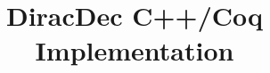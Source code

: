 \documentclass{article}
\title{\textbf{DiracDec C++/Coq Implementation\cite{ExampleCitation}}}
\begin{document}
\maketitle


\newcommand{\reduce}{\triangleright}

\newcommand{\Sort}{\mathsf{Sort}}
\newcommand{\WF}{\mathcal{WF}}

\newcommand{\Type}{\mathsf{Type}}
\newcommand{\BaseS}{\mathsf{Base}}

\newcommand{\SType}{\mathcal{S}}
\newcommand{\KType}{\mathcal{K}}
\newcommand{\BType}{\mathcal{B}}
\newcommand{\OType}{\mathcal{O}}

\newcommand{\ZEROK}{\mathbf{0}_\mathcal{K}}
\newcommand{\ZEROB}{\mathbf{0}_\mathcal{B}}
\newcommand{\ZEROO}{\mathbf{0}_\mathcal{O}}

\newcommand{\PAIR}{\mathsf{PAIR}}

\newcommand{\ZERO}{\mathsf{0}}
\newcommand{\ONE}{\mathsf{1}}
\newcommand{\ADDS}{\mathsf{ADDS}}
\newcommand{\ADD}{\mathsf{ADD}}
\newcommand{\MULS}{\mathsf{MULS}}
\newcommand{\MUL}{\mathsf{MUL}}
\newcommand{\CONJ}{\mathsf{CONJ}}
\newcommand{\CJG}{\mathsf{CJG}}
\newcommand{\ADJ}{\mathsf{ADJ}}
\newcommand{\DELTA}{\mathsf{DELTA}}
\newcommand{\DOT}{\mathsf{DOT}}
\newcommand{\SCR}{\mathsf{SCR}}
\newcommand{\TSR}{\mathsf{TSR}}
\newcommand{\KET}{\mathsf{KET}}
\newcommand{\BRA}{\mathsf{BRA}}
\newcommand{\ONEO}{\mathbf{1}_\mathcal{O}}
\newcommand{\OUTER}{\mathsf{OUTER}}
\newcommand{\MULK}{\mathsf{MULK}}
\newcommand{\MULB}{\mathsf{MULB}}
\newcommand{\MULO}{\mathsf{MULO}}

\end{document}
